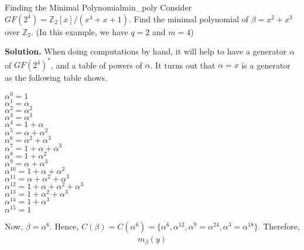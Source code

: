 \begin{Example}{Finding the Minimal Polynomial}{min_poly}
    Consider $ GF(2^4)=\mathbb{Z}_2[x]/(x^4+x+1) $. Find the minimal
    polynomial of $ \beta=x^2+x^3 $ over $ \mathbb{Z}_2 $.
    (In this example, we have $ q=2 $ and $ m=4 $)

    \textbf{Solution.} When doing computations by hand, it will help to
    have a generator $ \alpha $ of $ GF(2^4)^* $, and a table
    of powers of $ \alpha $. It turns out that $ \alpha=x $ is a generator
    as the following table shows.
    \begin{center}
        \begin{multicols}{4}
            $ \alpha^0=1 $                             \\
            $ \alpha^1=\alpha $                        \\
            $ \alpha^2=\alpha^2 $                      \\
            $ \alpha^3=\alpha^3 $                      \\
            $ \alpha^4=1+\alpha $                      \\
            $ \alpha^5=\alpha+\alpha^2 $               \\
            $ \alpha^6=\alpha^2+\alpha^3 $             \\
            $ \alpha^7=1+\alpha+\alpha^3 $             \\
            $ \alpha^8=1+\alpha^2 $                    \\
            $ \alpha^9=\alpha+\alpha^3 $               \\
            $ \alpha^{10}=1+\alpha+\alpha^2 $          \\
            $ \alpha^{11}=\alpha+\alpha^2+\alpha^3 $   \\
            $ \alpha^{12}=1+\alpha+\alpha^2+\alpha^3 $ \\
            $ \alpha^{13}=1+\alpha^2+\alpha^3 $        \\
            $ \alpha^{14}=1+\alpha^3 $                 \\
            $ \alpha^{15}=1 $                          \\
        \end{multicols}
    \end{center}
    Now, $ \beta=\alpha^6 $. Hence,
    $ C(\beta)=C(\alpha^6)=\{\alpha^6,\alpha^{12},\alpha^9=\alpha^{24},
        \alpha^3=\alpha^{18}\} $. Therefore,
    \begin{align*}
        m_\beta(y)

\end{align*}
\end{Example}
